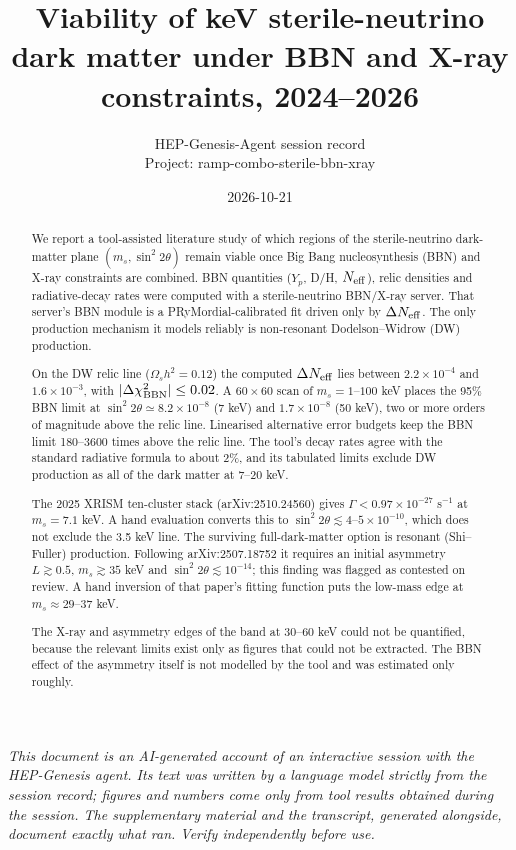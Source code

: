 \documentclass[11pt,a4paper]{article}
\title{Viability of keV sterile-neutrino dark matter under BBN and X-ray constraints, 2024--2026}
\author{HEP-Genesis-Agent session record \\ \small Project: ramp-combo-sterile-bbn-xray}
\date{2026-10-21}
\begin{document}
\maketitle
\noindent\textit{\small This document is an AI-generated account of an interactive session with the HEP-Genesis agent. Its text was written by a language model strictly from the session record; figures and numbers come only from tool results obtained during the session. The supplementary material and the transcript, generated alongside, document exactly what ran. Verify independently before use.}
\vspace{1em}

\begin{abstract}
We report a tool-assisted literature study of which regions of the sterile-neutrino dark-matter plane $(m_s,\sin^2 2\theta)$ remain viable once Big Bang nucleosynthesis (BBN) and X-ray constraints are combined. BBN quantities ($Y_p$, D/H, $N_{\rm eff}$), relic densities and radiative-decay rates were computed with a sterile-neutrino BBN/X-ray server. That server's BBN module is a PRyMordial-calibrated fit driven only by $\Delta N_{\rm eff}$. The only production mechanism it models reliably is non-resonant Dodelson--Widrow (DW) production.

On the DW relic line ($\Omega_s h^2=0.12$) the computed $\Delta N_{\rm eff}$ lies between $2.2\times10^{-4}$ and $1.6\times10^{-3}$, with $|\Delta\chi^2_{\rm BBN}|\le0.02$. A $60\times60$ scan of $m_s=1$--$100$ keV places the 95\% BBN limit at $\sin^2 2\theta\simeq8.2\times10^{-8}$ (7 keV) and $1.7\times10^{-8}$ (50 keV), two or more orders of magnitude above the relic line. Linearised alternative error budgets keep the BBN limit 180--3600 times above the relic line. The tool's decay rates agree with the standard radiative formula to about 2\%, and its tabulated limits exclude DW production as all of the dark matter at 7--20 keV.

The 2025 XRISM ten-cluster stack (arXiv:2510.24560) gives $\Gamma<0.97\times10^{-27}$ s$^{-1}$ at $m_s=7.1$ keV. A hand evaluation converts this to $\sin^2 2\theta\lesssim4$--$5\times10^{-10}$, which does not exclude the 3.5 keV line. The surviving full-dark-matter option is resonant (Shi--Fuller) production. Following arXiv:2507.18752 it requires an initial asymmetry $L\gtrsim0.5$, $m_s\gtrsim35$ keV and $\sin^2 2\theta\lesssim10^{-14}$; this finding was flagged as contested on review. A hand inversion of that paper's fitting function puts the low-mass edge at $m_s\approx29$--$37$ keV.

The X-ray and asymmetry edges of the band at 30--60 keV could not be quantified, because the relevant limits exist only as figures that could not be extracted. The BBN effect of the asymmetry itself is not modelled by the tool and was estimated only roughly.
\end{abstract}
\end{document}

